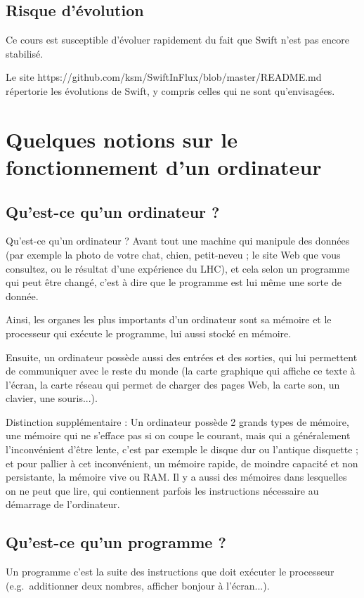 \subsection{Risque d’évolution}
Ce cours est susceptible d'évoluer rapidement du fait que Swift n'est pas encore stabilisé.

Le site https://github.com/ksm/SwiftInFlux/blob/master/README.md répertorie les
évolutions de Swift, y compris celles qui ne sont qu’envisagées.
\section{Quelques notions sur le fonctionnement d'un ordinateur}
\subsection{Qu'est-ce qu'un ordinateur ?}
Qu'est-ce qu'un ordinateur ? Avant tout une machine qui manipule des données (par
exemple la photo de votre chat, chien, petit-neveu ; le site Web que vous consultez, ou le
résultat d'une expérience du LHC), et cela selon un programme qui peut être changé,
c'est à dire que le programme est lui même une sorte de donnée.

Ainsi, les organes les plus importants d'un ordinateur sont sa mémoire et le processeur
qui exécute le programme, lui aussi stocké en mémoire.

Ensuite, un ordinateur possède aussi des entrées et des sorties, qui lui permettent de
communiquer avec le reste du monde (la carte graphique qui affiche ce texte à l'écran, la
carte réseau qui permet de charger des pages Web, la carte son, un clavier, une souris...).

Distinction supplémentaire : Un ordinateur possède 2 grands types de mémoire, une
mémoire qui ne s'efface pas si on coupe le courant, mais qui a généralement
l'inconvénient d'être lente, c'est par exemple le disque dur ou l'antique disquette ; et pour
pallier à cet inconvénient, un mémoire rapide, de moindre capacité et non persistante, la
mémoire vive ou RAM. Il y a aussi des mémoires dans lesquelles on ne peut que lire, qui
contiennent parfois les instructions nécessaire au démarrage de l'ordinateur.
\subsection{Qu'est-ce qu'un programme ?}
Un programme c'est la suite des instructions que doit exécuter le processeur
(e.g.\ additionner deux nombres, afficher bonjour à l'écran...).

